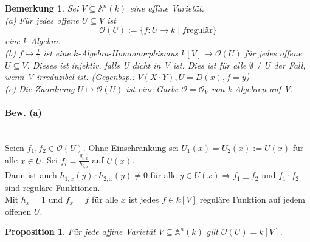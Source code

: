 \documentclass[a4paper,12pt]{report}
\theoremstyle{break}
\newtheorem{Bem}[Def]{Bemerkung}
\newtheorem{Prop}[Def]{Proposition}
\theoremstyle{nonumberbreak}
\theoremstyle{nonumberplain}
\begin{document}
\begin{Bem}
Sei $V\subseteq \mathbb{A}^n(k)$ eine affine Varietät.\\
(a) Für jedes offene $U\subseteq V$ ist
$$\mathcal{O}(U):= \{f: U \rightarrow k \mid f \textrm{regulär}\}$$
eine $k$-Algebra.\\
(b) $f\mapsto \frac{f}{1}$ ist eine $k$-Algebra-Homomorphismus $k[V]\rightarrow \mathcal{O}(U)$ für jedes offene $U\subseteq V$. Dieses ist injektiv, falls U dicht in V ist. Dies ist für alle $\emptyset\neq U$ der Fall, wenn V irreduzibel ist. (Gegenbsp.: $V(X\cdot Y), U=D(x), f=y$)\\
(c) Die Zuordnung $U\mapsto \mathcal{O}(U)$ ist eine Garbe $\mathcal{O}=\mathcal{O}_V$ von k-Algebren auf V.
\end{Bem}
\paragraph{Bew. (a)}~\\
Seien $f_1,f_2\in\mathcal{O}(U)$. Ohne Einschränkung sei $U_1(x)=U_2(x):=U(x)$ für alle $x\in U$.
Sei $f_i=\frac{g_{i,x}}{h_{i,x}}$ auf $U(x)$.\\
Dann ist auch $h_{1,x}(y)\cdot h_{2,x}(y)\neq 0$ für alle $y\in U(x) \Rightarrow f_1\pm f_2$ und $f_1\cdot f_2$ sind reguläre Funktionen.\\
Mit $h_x=1$ und $f_x=f$ für alle $x$ ist jedes $f\in k[V]$ reguläre Funktion auf jedem offenen $U$.
\begin{Prop}
Für jede affine Varietät $V\subseteq\mathbb{A}^n(k)$ gilt $\mathcal{O}(U)=k[V]$.
\end{Prop}
\end{document}

